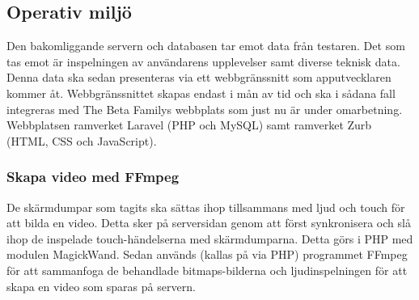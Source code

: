 \subsection{Operativ miljö}
Den bakomliggande servern och databasen tar emot data från testaren. Det som tas emot är inspelningen av användarens upplevelser samt diverse teknisk data. Denna data ska sedan presenteras via ett webbgränssnitt som apputvecklaren kommer åt. Webbgränssnittet skapas endast i mån av tid och ska i sådana fall integreras med The Beta Familys webbplats som just nu är under omarbetning. Webbplatsen ramverket Laravel (PHP och MySQL) samt ramverket Zurb (HTML, CSS och JavaScript).

\subsubsection{Skapa video med FFmpeg}
De skärmdumpar som tagits ska sättas ihop tillsammans med ljud och touch för att bilda en video. Detta sker på serversidan genom att först synkronisera och slå ihop de inspelade touch-händelserna med skärmdumparna. Detta görs i PHP med modulen MagickWand\parencite{magickwand}. Sedan används (kallas på via PHP) programmet FFmpeg\parencite{ffmpeg} för att sammanfoga de behandlade bitmaps-bilderna och ljudinspelningen för att skapa en video som sparas på servern.